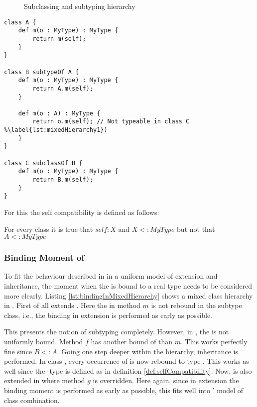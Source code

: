 \begin{figure}[ht]
	\centering
	\caption{Subclassing and subtyping hierarchy}
	\label{fig:hierarchy}
\end{figure}

\begin{lstlisting}[float=ht,language=ooplss,caption=Mixed extension and inheritance hierarchy,label=lst:mixedHierarchy]
class A {
	def m(o : MyType) : MyType {
		return m(self);
	}
}

class B subtypeOf A {
	def m(o : MyType) : MyType {
		return A.m(self);
	}

	def m(o : A) : MyType {
		return o.m(self); // Not typeable in class C %\label{lst:mixedHierarchy1})
	}
}

class C subclassOf B {
	def m(o : MyType) : MyType {
		return B.m(self);
	}
}
\end{lstlisting}

For this the self compatibility is defined as follows:

\begin{defn}
	\label{def:selfCompatibility}
	For every class \A it is true that $self : X$ and $X <: MyType$ but not that $A <: MyType$
\end{defn}

\subsubsection{Binding Moment of \mytype}
To fit the behaviour described in  in a
uniform model of extension and inheritance, the moment when the \mytype is
bound to a real type needs to be considered more clearly. Listing
\ref{lst:bindingInMixedHierarchy} shows a mixed class hierarchy in
\ooplss. First of all \B extends \A. Here the \mytype in method $m$ is
not rebound in the subtype class, i.e., the \mytype binding in extension
is performed as early as possible.

This presents the notion of subtyping completely. However, in \B, the \mytype
is not uniformly bound. Method $f$ has another bound of \mytype than
$m$. This works perfectly fine since $B <: A$. Going one step deeper within
the hierarchy, inheritance is performed. In class \C, every occurrence
of \mytype is now rebound to type \C. This works as well since the
\self-type is defined as in definition \ref{def:selfCompatibility}. Now,
\C is also extended in \D where method $g$ is overridden. Here again,
since in extension the binding moment is performed as early as possible,
this fits well into \ooplss' model of class combination.

